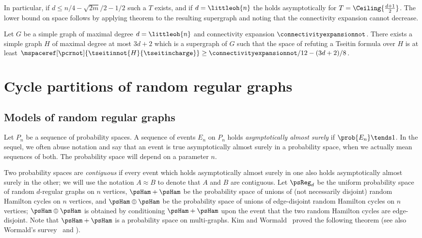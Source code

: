In particular, if $d\leq n/4-\sqrt{2 m}/2-1/2$ such a $T$ exists, and if $d=\littleoh{n}$ the  holds asymptotically for $T=\Ceiling{\frac{d+1}{2}}$. The lower bound on space follows by applying theorem  to the resulting supergraph and noting that the connectivity expansion cannot decrease.

\begin{theorem}
\label{th:triangulation}
Let $G$ be a simple graph of maximal degree $d=\littleoh{n}$ and connectivity expansion $\connectivityexpansionnot$. There exists a simple graph $H$ of maximal degree at most $3d+2$ which is a supergraph of $G$ such that the space of refuting a Tseitin formula over $H$ is at least $\mspaceref[\pcrnot]{\tseitinnot{H}{\tseitincharge}} \geq \connectivityexpansionnot/12-(3d+2)/8$.
\end{theorem}
\section{Cycle partitions of random regular graphs} 
\label{sec:cycle-partitions}

\subsection{Models of random regular graphs}
Let $P_n$ be a sequence of probability spaces. A sequence of events $E_n$ on $P_n$ holds \emph{asymptotically almost surely} if $\prob{E_n} \tends 1$. In the sequel, we often abuse notation and say that an event is true asymptotically almost surely in a probability space, when we actually mean sequences of both. The probability space will depend on a parameter $n$.

Two probability spaces are \emph{contiguous} if every event which holds asymptotically almost surely in one also holds asymptotically almost surely in the other; we will use the notation $A \approx B$ to denote that $A$ and $B$ are contiguous.
%
%
%
%
Let $\psReg_d$ be the uniform probability space of random $d$-regular graphs on $n$ vertices, $\psHam+\psHam$ be the probability space of unions of (not necessarily disjoint) random Hamilton cycles on $n$ vertices, and $\psHam \oplus \psHam$ be the probability space of unions of edge-disjoint random Hamilton cycles on $n$ vertices; $\psHam \oplus \psHam$ is obtained by conditioning $\psHam + \psHam$ upon the event that the two random Hamilton cycles are edge-disjoint. Note that $\psHam + \psHam$ is a probability space on multi-graphs. Kim and Wormald~\cite{KW} proved the following theorem (see also Wormald's survey~\cite{W} and \cite[\S 9.3--9.6]{JLR}).

